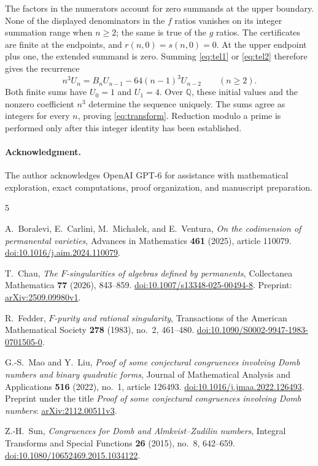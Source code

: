 \documentclass[11pt]{article}
\theoremstyle{remark}\newtheorem{remark}[theorem]{Remark}
\numberwithin{equation}{section}
\begin{document}
The factors in the numerators account for zero summands at the upper
boundary. None of the displayed denominators in the $f$ ratios
vanishes on its integer summation range when $n\ge2$; the same is
true of the $g$ ratios. The certificates are finite at the endpoints,
and $r(n,0)=s(n,0)=0$. At the upper endpoint plus one, the extended
summand is zero. Summing \eqref{eq:tel1} or \eqref{eq:tel2} therefore
gives the recurrence
\[
 n^3U_n=B_nU_{n-1}-64(n-1)^3U_{n-2}\qquad(n\ge2).
\]
Both finite sums have $U_0=1$ and $U_1=4$. Over $\mathbb Q$, these
initial values and the nonzero coefficient $n^3$ determine the
sequence uniquely. The sums agree as integers for every $n$, proving
\eqref{eq:transform}. Reduction modulo a prime is performed only
after this integer identity has been established.

\paragraph{Acknowledgment.}
The author acknowledges OpenAI GPT-6 for assistance with mathematical
exploration, exact computations, proof organization, and manuscript
preparation.

\begingroup\small
\begin{thebibliography}{5}\raggedright
{}
A.~Boralevi, E.~Carlini, M.~Micha\l{}ek, and E.~Ventura,
\emph{On the codimension of permanental varieties},
Advances in Mathematics \textbf{461} (2025), article 110079.
\href{https://doi.org/10.1016/j.aim.2024.110079}{doi:10.1016/j.aim.2024.110079}.

T.~Chau, \emph{The $F$-singularities of algebras defined by permanents},
Collectanea Mathematica \textbf{77} (2026), 843--859.
\href{https://doi.org/10.1007/s13348-025-00494-8}{doi:10.1007/s13348-025-00494-8}.
Preprint: \href{https://arxiv.org/abs/2509.09980v1}{arXiv:2509.09980v1}.

R.~Fedder, \emph{$F$-purity and rational singularity},
Transactions of the American Mathematical Society \textbf{278}
(1983), no.~2, 461--480.
\href{https://doi.org/10.1090/S0002-9947-1983-0701505-0}{doi:10.1090/S0002-9947-1983-0701505-0}.

G.-S.~Mao and Y.~Liu, \emph{Proof of some conjectural congruences
involving Domb numbers and binary quadratic forms},
Journal of Mathematical Analysis and Applications \textbf{516}
(2022), no.~1, article 126493.
\href{https://doi.org/10.1016/j.jmaa.2022.126493}{doi:10.1016/j.jmaa.2022.126493}.
Preprint under the title \emph{Proof of some conjectural congruences
involving Domb numbers}:
\href{https://arxiv.org/abs/2112.00511v3}{arXiv:2112.00511v3}.

Z.-H.~Sun, \emph{Congruences for Domb and Almkvist--Zudilin numbers},
Integral Transforms and Special Functions \textbf{26} (2015),
no.~8, 642--659.
\href{https://doi.org/10.1080/10652469.2015.1034122}{doi:10.1080/10652469.2015.1034122}.
\end{thebibliography}
\endgroup
\end{document}
